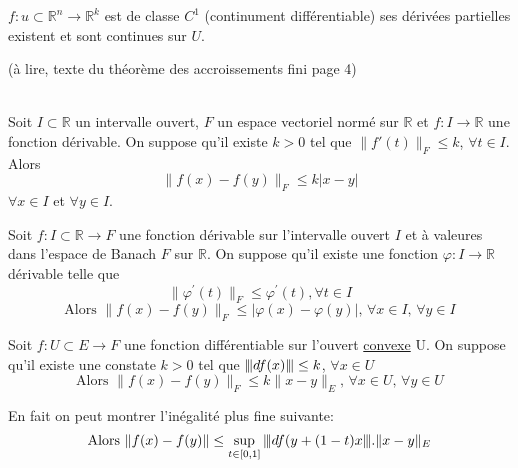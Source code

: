 \documentclass[12pt,a4paper]{article}
\begin{document}
\begin{flushleft}
\begin{thm}
$f: u \subset \mathbb{R}^n \longrightarrow \mathbb{R}^k$ est de classe $C^1$ (continument différentiable) \ssi ses dérivées partielles existent et sont continues sur $U$.
\end{thm} 

(à lire, texte du théorème des accroissements fini page 4)\\~\\

\begin{thm}
Soit $I \subset \mathbb{R}$ un intervalle ouvert, $F$ un espace vectoriel normé sur $\mathbb{R}$ et $f: I \longrightarrow \mathbb{R}$ une fonction dérivable. On suppose qu'il existe $k > 0$ tel que $\lVert f'(t) \rVert_F \leq k$, $\forall t \in I$. Alors $$ \lVert f(x) - f(y) \rVert_F \leq k |x-y|$$ $\forall x \in I$ et $\forall y \in I$.
\end{thm}

\begin{thm}
Soit $f: I \subset \mathbb{R} \longrightarrow F$ une fonction dérivable sur l'intervalle ouvert $I$ et à valeures dans l'espace de Banach $F$ sur $\mathbb{R}$. On suppose qu'il existe une fonction $\varphi : I \longrightarrow \mathbb{R}$ dérivable telle que $$\lVert \varphi^\prime (t) \rVert_F \leq \varphi^\prime (t), \forall t\in I$$
$$ \text{Alors } \lVert f(x) - f(y) \rVert_F \leq | \varphi(x) - \varphi(y) | \text{, } \forall x \in I \text{, } \forall y \in I$$
\end{thm}

\begin{thm}
Soit $f: U \subset E \longrightarrow F$ une fonction différentiable sur l'ouvert \underline{convexe} U. On suppose qu'il existe une constate $k > 0$ tel que ${\left\vert\kern-0.25ex\left\vert\kern-0.25ex\left\vert df(x) \right\vert\kern-0.25ex\right\vert\kern-0.25ex\right\vert} \leq k$, $\forall x \in U$ $$ \text{Alors } \lVert f(x) - f(y) \rVert_F \leq k \lVert x-y \rVert_E \text{, } \forall x \in U \text{, } \forall y \in U$$
\end{thm}

\begin{rem}
En fait on peut montrer l'inégalité plus fine suivante: $$ \text{Alors } \lVert f(x) - f(y) \rVert \leq \sup\limits_{t \in [0,1]} {\left\vert\kern-0.25ex\left\vert\kern-0.25ex\left\vert df(y + (1-t)x \right\vert\kern-0.25ex\right\vert\kern-0.25ex\right\vert} . \lVert x-y \rVert_E$$
\end{rem}































\end{flushleft}
\end{document}
